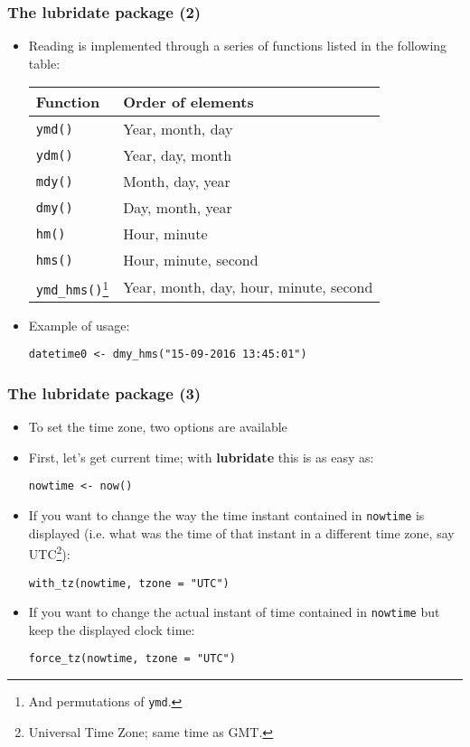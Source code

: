 \documentclass[10pt]{beamer}
\theoremstyle{definition}
\begin{document}
\begin{frame}[fragile]
\frametitle{The \textbf{lubridate} package (2)}
\begin{itemize}
	\item Reading is implemented through a series of functions listed in the following table:
	\bigskip
	
	\begin{tabular}{ll}
	\toprule
	Function & Order of elements\\
	\midrule
	\texttt{ymd()} & Year, month, day\\
	\texttt{ydm()} & Year, day, month\\
	\texttt{mdy()} & Month, day, year\\
	\texttt{dmy()} & Day, month, year\\
	\texttt{hm()} & Hour, minute\\
	\texttt{hms()} & Hour, minute, second\\
	\texttt{ymd\_hms()}\footnote{And permutations of \texttt{ymd}.} & Year, month, day, hour, minute, second\\
	\bottomrule
	\end{tabular}
	\item Example of usage:
	\begin{lstlisting}[style = rstyle, breaklines]
	datetime0 <- dmy_hms("15-09-2016 13:45:01")
	\end{lstlisting}
\end{itemize}
\end{frame}

\begin{frame}[fragile]
\frametitle{The \textbf{lubridate} package (3)}
\begin{itemize}
	\item To set the time zone, two options are available
	\item First, let's get current time; with \textbf{lubridate} this is as easy as:
	\begin{lstlisting}[style = rstyle, breaklines]
	nowtime <- now()
	\end{lstlisting}
	\item If you want to change the way the time instant contained in \texttt{nowtime} is displayed (i.e. what was the time of that instant in a different time zone, say UTC\footnote{Universal Time Zone; same time as GMT.}):
	\begin{lstlisting}[style = rstyle, breaklines]
	with_tz(nowtime, tzone = "UTC")
	\end{lstlisting}
	\item If you want to change the actual instant of time contained in
\texttt{nowtime} but keep the displayed clock time:
	\begin{lstlisting}[style = rstyle, breaklines]
	force_tz(nowtime, tzone = "UTC")
	\end{lstlisting}
\end{itemize}
\end{frame}
\end{document}
